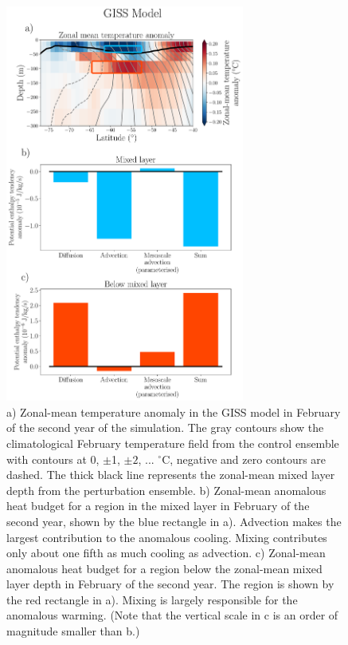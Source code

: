 \documentclass{ametsocV5}
\begin{document}
\begin{figure}[!ht]
    \begin{center}
        \includegraphics[width=0.7\textwidth]{figures/GISS_zm_temperature_anoms_heat_budget.pdf}
        \caption{a) Zonal-mean temperature anomaly in the GISS model in February of the second year of the simulation. The gray contours show the climatological February temperature field from the control ensemble with contours at 0, $\pm$1, $\pm2$, ... $^{\circ}$C, negative and zero contours are dashed. The thick black line represents the zonal-mean mixed layer depth from the perturbation ensemble.
        b) Zonal-mean anomalous heat budget for a region in the mixed layer in February of the second year, shown by the blue rectangle in a). Advection makes the largest contribution to the anomalous cooling. Mixing contributes only about one fifth as much cooling as advection.
        c) Zonal-mean anomalous heat budget for a region below the zonal-mean mixed layer depth in February of the second year. The region is shown by the red rectangle in a). Mixing is largely responsible for the anomalous warming. (Note that the vertical scale in c is an order of magnitude smaller than b.)}
        \label{fig:GISS_zm_temperature_anoms_heat_budget}
    \end{center}
\end{figure}
\end{document}
